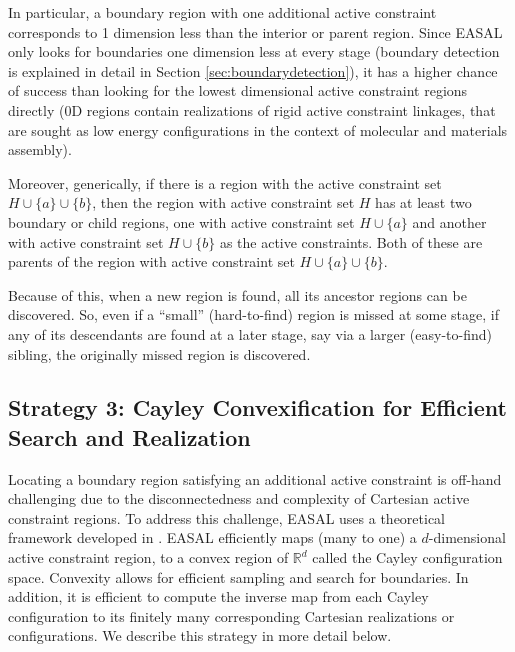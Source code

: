 In particular, a boundary region with one additional active constraint
corresponds to 1 dimension less than the interior or parent region. Since
EASAL only looks for boundaries one dimension less at every stage (boundary
detection is explained in detail in Section \ref{sec:boundarydetection}), it
has a higher chance of success than looking for the lowest dimensional active
constraint regions directly (0D regions contain realizations of rigid active
constraint linkages, that are sought as low energy configurations in the
context of molecular and materials assembly).

Moreover, generically, if there is a region with the active
constraint set $H \cup \{a\} \cup \{b\}$, then the region with active
constraint set $H$ has at least two boundary or child regions, one with active
constraint set $H \cup \{a\}$ and another with active constraint set $H \cup
\{b\}$ as the active constraints. Both of these are parents of the region with
active constraint set $H \cup \{a\} \cup \{b\}$.


Because of this, when a new region is found, all its ancestor regions can be
discovered. So, even if a ``small'' (hard-to-find) region is missed at some
stage, if any of its descendants are found at a later stage, say via a larger
(easy-to-find) sibling, the originally missed region is discovered.

\subsection{Strategy 3: Cayley Convexification for Efficient Search and Realization} 
\label{sec:convexification} 

Locating a boundary region satisfying an additional active constraint is
off-hand challenging due to the disconnectedness and complexity of Cartesian
active constraint regions. To address this challenge, EASAL uses a theoretical
framework developed in \cite{SiGa:2010}. EASAL efficiently maps (many to one) a
$d$-dimensional active constraint region, to a convex region of $\mathbb{R}^d$ called
the Cayley configuration space. Convexity allows for efficient sampling and
search for boundaries. In addition, it is efficient to compute the inverse map
from each Cayley configuration to its finitely many corresponding Cartesian
realizations or configurations. We describe this strategy in more detail
below.



